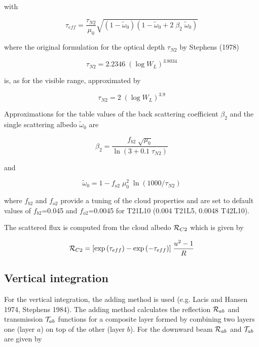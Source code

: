 with

\begin{equation}
\tau_{eff}=\frac{\tau_{N2}}{\mu_0}\sqrt{(1-
\tilde{\omega}_0)(1-\tilde{\omega}_0 + 2 \; \beta_2 \;
\tilde{\omega}_0)}
\end{equation}

where the original formulation for the optical depth
$\tau_{N2}$ by Stephens (1978)

\begin{equation}
\tau_{N2}=2.2346 \; (\log{W_L})^{3.8034}
\end{equation}

is, as for the visible range, approximated by

\begin{equation}
\tau_{N2}= 2 \; (\log{W_L})^{3.9}
\end{equation}

Approximations for the table values of the back
scattering coefficient $\beta_2$ and the single
scattering albedo $\tilde{\omega}_0$ are

\begin{equation}
\beta_2=\frac{f_{b2}\; \sqrt{\mu_0}}{\ln{(3+0.1\;
\tau_{N2})}}
\end{equation}

and

\begin{equation}
\tilde{\omega}_0=1-
f_{o2}\;\mu_0^2\;\ln{(1000/\tau_{N2})}
\end{equation}

where $f_{b2}$ and $f_{o2}$ provide a tuning of the
cloud
properties and are set to default values of $f_{b2}$=0.045
and $f_{o2}$=0.0045 for T21L10 (0.004 T21L5, 0.0048 T42L10). 

The scattered flux is computed from the cloud albedo
${\cal R}_{C2}$ which is given by

\begin{equation}
{\cal R}_{C2}=[\exp{(\tau_{eff})}-\exp{(-\tau_{eff})}]
\; \frac{u^2-
1}{R}
\end{equation}
 


\subsection*{Vertical integration}

For the vertical integration, the adding method is used
(e.g. Lacis and Hansen 1974, Stephens  1984). The
adding method calculates the reflection ${\cal R}_{ab}$
and transmission ${\cal T}_{ab}$  functions for a
composite layer formed by combining two layers one
(layer $a$) on top of the other (layer $b$). For the
downward beam ${\cal R}_{ab}$ and ${\cal T}_{ab}$ are given by

